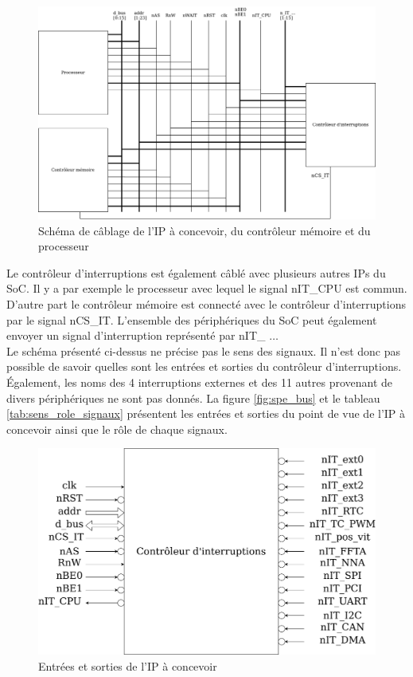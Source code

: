 \begin{figure}[H]
	\centering
	\includegraphics[width=1\linewidth]{figure/schema_cablage.png}
	\caption{Schéma de câblage de l'IP à concevoir, du contrôleur mémoire et du processeur}
	\label{fig:schema_cablage}
\end{figure}
	
Le contrôleur d'interruptions est également câblé avec plusieurs autres IPs du SoC.
Il y a par exemple le processeur avec lequel le signal nIT\_CPU est commun.
D'autre part le contrôleur mémoire est connecté avec le contrôleur d'interruptions par le signal nCS\_IT. L'ensemble des périphériques du SoC peut également envoyer un signal d'interruption représenté par nIT\_ $\dots$\\
	
Le schéma présenté ci-dessus ne précise pas le sens des signaux.
Il n'est donc pas possible de savoir quelles sont les entrées et sorties du contrôleur d'interruptions.
Également, les noms des 4 interruptions externes et des 11 autres provenant de divers périphériques ne sont pas donnés.
La figure \ref{fig:spe_bus} et le tableau \ref{tab:sens_role_signaux} présentent les entrées et sorties du point de vue de l'IP à concevoir ainsi que le rôle de chaque signaux. 
	
\begin{figure}[H]
	\centering
	\includegraphics[width=1\linewidth]{figure/delimitation_systeme.png}
	\caption{Entrées et sorties de l'IP à concevoir}
	\label{fig:inout_ip}
\end{figure}


